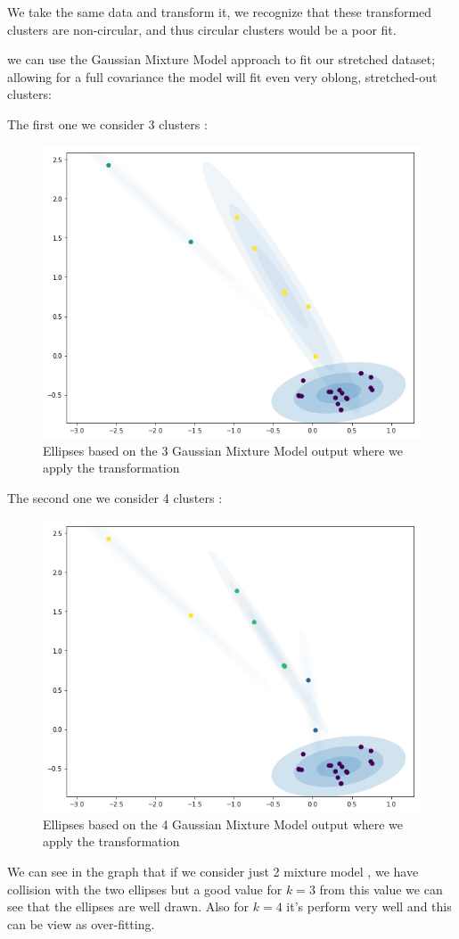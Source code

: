 \documentclass[12pt,twoside]{article}
\begin{document}
We take the same data and transform it, we recognize that these transformed clusters are non-circular, and thus circular clusters would be a poor fit.

we can use the Gaussian Mixture Model approach to fit our stretched dataset; allowing for a full covariance the model will fit even very oblong, stretched-out clusters:

The first one we consider 3 clusters :
\begin{center}
	\begin{figure}
		\includegraphics[scale=0.7]{6.png}
		\caption{Ellipses based on the 3 Gaussian Mixture Model output where we apply the transformation}	     
	\end{figure}
\end{center}

The second one we consider 4 clusters :
\begin{center}
	\begin{figure}
		\includegraphics[scale=0.7]{7.png}
		\caption{Ellipses based on the 4 Gaussian Mixture Model output where we apply the transformation}	     
	\end{figure}
\end{center}

We can see  in the graph that if we consider just 2 mixture model , we have collision with the two ellipses but a good value for $k = 3$ from this value we can see that the ellipses are well drawn. Also for $k = 4$ it's perform very well and this can be view as over-fitting. 
\end{document}
